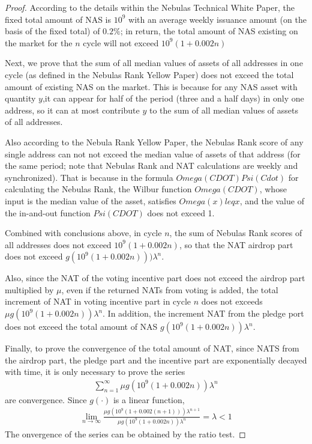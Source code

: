 \begin{proof}
	According to the details within the Nebulas Technical White Paper, the fixed total amount of NAS is $10^9$ with an average weekly issuance amount (on the basis of the fixed total) of $0.2\%$; in return, the total amount of NAS existing on the market for the $n$ cycle will not exceed $10^9 (1+0.002n) $
	
	Next, we prove that the sum of all median values of assets of all addresses in one cycle (as defined in the Nebulas Rank Yellow Paper) does not exceed the total amount of existing NAS on the market. This is because for any NAS asset with quantity $y$,it can appear for half of the period (three and a half days) in only one address, so it can at most contribute $y$ to the sum of all median values of assets of all addresses.
	
	Also according to the Nebula Rank Yellow Paper, the Nebulas Rank score of any single address can not not exceed the median value of assets of that address (for the same period; note that Nebulas Rank and NAT calculations are weekly and synchronized). That is because in the formula $Omega(CDOT)Psi(Cdot)$ for calculating the Nebulas Rank, the Wilbur function $Omega(CDOT)$, whose input is the median value of the asset, satisfies $Omega (x) leq x$, and the value of the in-and-out function $Psi(CDOT)$ does not exceed 1.
	
	Combined with conclusions above, in cycle $n$, the sum of Nebulas Rank scores of all addresses does not exceed $10^9(1+0.002n)$, so that the NAT airdrop part does not exceed $g(10^9(1+0.002n)))\lambda^n$.
	
	Also, since the NAT of the voting incentive part does not exceed the airdrop part multiplied by $\mu$, even if the returned NATs from voting is added, the total increment of NAT in voting incentive part in cycle $n$ does not exceeds $\mu g(10^9( 1+0.002n))\lambda^n$. In addition, the increment NAT from the pledge port does not exceed the total amount of NAS $g (10^9(1+0.002n))\lambda^n$.
	
	Finally, to prove the convergence of the total amount of NAT, since NATS  from the airdrop part, the pledge part and the incentive part are exponentially decayed with time, it is only necessary to prove the series
	\begin{align}
	\sum_{n=1}^{\infty} \mu g(10^9(1+0.002n))\lambda^n
	\end{align}
    are	convergence. Since $g(\cdot)$ is a linear function,
	\begin{align}
	\lim_{n\rightarrow \infty} \frac{\mu g(10^9(1+0.002(n+1)))\lambda^{n+1}}{\mu g(10^9(1+ 0.002n))\lambda^n} = \lambda <1
	\end{align}
	The onvergence of the series can be obtained by the ratio test.
\end{proof}

